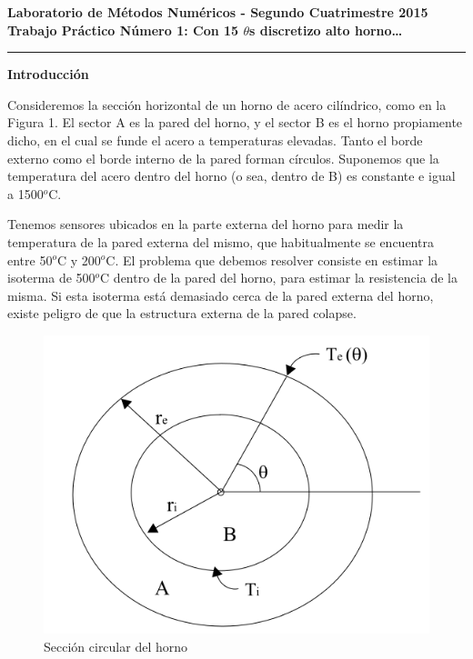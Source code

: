\setcounter{equation}{0}

\begin{centering}
\bf Laboratorio de M\'etodos Num\'ericos - Segundo Cuatrimestre 2015 \\
\bf Trabajo Pr\'actico N\'umero 1: Con 15 $\theta$s discretizo alto horno\ldots\\
\end{centering}

\vskip 25pt
\hrule
\vskip 11pt

{\bf Introducción}

Consideremos la secci\'on horizontal de un horno de acero cil\'indrico, como en la Figura 1. El sector A es la pared del horno, y el sector B es el horno propiamente dicho, en el cual se funde el acero a temperaturas elevadas. Tanto el borde externo como el borde interno de la pared forman c\'irculos. Suponemos que la temperatura del acero dentro del horno (o sea, dentro de B) es constante e igual a 1500$^{o}$C.

\medskip

Tenemos sensores ubicados en la parte externa del horno para medir la temperatura de la pared externa del mismo, que habitualmente se encuentra entre 50$^{o}$C y 200$^{o}$C. El problema que debemos resolver consiste en estimar la isoterma de 500$^{o}$C dentro de la pared del horno, para estimar la resistencia de la misma. Si esta isoterma est\'a demasiado cerca de la pared externa del horno, existe peligro de que la estructura externa de la pared colapse.


\begin{figure}[ht]
\begin{center}
\includegraphics[width=0.6\columnwidth]{catedra/Horno.png}
\caption{Secci\'on circular del horno}
\end{center}
\end{figure}



